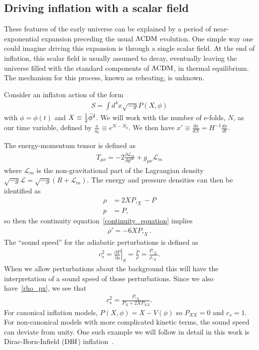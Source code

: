     \subsection{Driving inflation with a scalar field}
    These features of the early universe can be explained by a period of near-exponential expansion
    preceding the usual $\Lambda\text{CDM}$ evolution.
    One simple way one could imagine driving this expansion is through a single
    scalar field.
    At the end of inflation, this scalar field is usually assumed to decay,
    eventually leaving the universe filled with the standard components of $\Lambda\text{CDM}$,
    in thermal equilibrium. The mechanism for this process, known as reheating, is unknown.


Consider an inflaton action of the form
\begin{align}\label{inflaton_action}
S = \int d^4x \sqrt{-g}P(X,\phi)
\end{align}
with $\phi=\phi(t)$ and $X\equiv\frac{1}{2}\dot{\phi}^2$.
We will work with the number of e-folds, $N$, as our time variable,
defined by $\frac{a}{a_0}\equiv e^{N-N_0}$.
We then have
$x'\equiv\frac{dx}{dN}=H^{-1}\frac{dx}{dt}$.


The energy-momentum tensor is defined as
\begin{align}\label{gr_energy}
    T_{\mu\nu} = -2\frac{\partial\mathcal{L}_m}{\partial g^{\mu\nu}}+g_{\mu\nu}\mathcal{L}_m
\end{align}
where $\mathcal{L}_m$ is the non-gravitational part of the Lagrangian
density ${\sqrt{-g}\mathcal{L}=\sqrt{-g}\left(R+\mathcal{L}_m\right)}$.
The energy and pressure densities can then be identified as
\begin{align}\label{rho_px}
    \rho &= 2XP,_X-P\\
    p &= P,
\end{align}
so then the continuity equation~\eqref{continuity_equation} implies
\begin{align}\label{rho_deriv}
    \rho' = -6XP,_X.
\end{align}
    The ``sound speed'' for the adiabatic perturbations is defined as~\cite{Christopherson_2009}
    \begin{align}\label{sound_speed_definition}
        c_s^2 = \left. \frac{\partial P}{\partial \rho} \right|_S = \frac{\dot{P}}{\dot{\rho}}
        = \frac{P,_X}{\rho,_X}.
    \end{align}
    When we allow perturbations about the background this will have the interpretation
    of a sound speed of those perturbations.
    Since we also have~\eqref{rho_px}, we see that
    \begin{align}
        c_s^2 = \frac{P,_X}{P_X+2X P_{XX}}.
    \end{align}
    For canonical inflation models, $P(X,\phi)=X-V(\phi)$
    so $P_{XX}=0$ and $c_s=1$.
    For non-canonical models with more complicated kinetic terms,
    the sound speed can deviate from unity.
    One such example we will follow in detail in this work is
    Dirac-Born-Infield ($\text{DBI}$) inflation~\cite{dbi_in_the_sky}.


